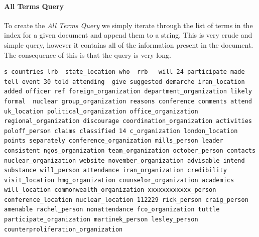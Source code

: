 \documentclass{l4proj}
\newenvironment{codelisting}{\captionsetup{type=listing}}{}
\begin{document}
\paragraph{All Terms Query}
To create the \textit{All Terms Query} we simply iterate through the list of terms in the index for a given document and append them to a string. This is very crude and simple query, however it contains all of the information present in the document. The consequence of this is that the query is very long.
\begin{codelisting}
\begin{verbatim}
s countries lrb  state_location who  rrb   will 24 participate made tell event 30 told attending  give suggested demarche iran_location added officer ref foreign_organization department_organization likely formal  nuclear group_organization reasons conference comments attend uk_location political_organization office_organization regional_organization discourage coordination_organization activities poloff_person claims classified 14 c_organization london_location points separately conference_organization mills_person leader consistent ngos_organization team_organization october_person contacts nuclear_organization website november_organization advisable intend substance will_person attendance iran_organization credibility visit_location hmg_organization counselor_organization academics will_location commonwealth_organization xxxxxxxxxxxx_person conference_location nuclear_location 112229 rick_person craig_person amenable rachel_person nonattendance fco_organization tuttle participate_organization martinek_person lesley_person counterproliferation_organization
\end{verbatim}
\label{code:all_terms_query}
\end{codelisting}
\end{document}
